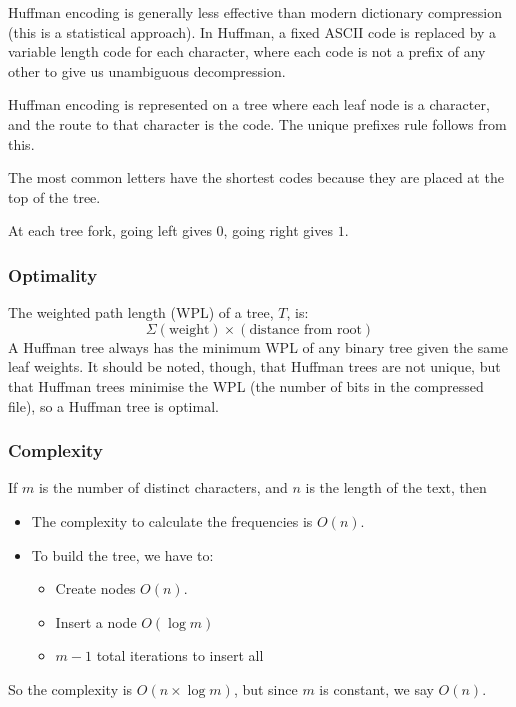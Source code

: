 Huffman encoding is generally less effective than modern dictionary compression (this is a statistical approach).
In Huffman, a fixed ASCII code is replaced by a variable length code for each character, where each code is not a prefix of any other to give us unambiguous decompression.

Huffman encoding is represented on a tree where each leaf node is a character, and the route to that character is the code.
The unique prefixes rule follows from this.

The most common letters have the shortest codes because they are placed at the top of the tree.

\begin{note}
    At each tree fork, going left gives \(0\), going right gives \(1\).
\end{note}

\subsubsection{Optimality}\label{ssub:optimality}

The weighted path length (WPL) of a tree, \(T\), is:
\[
    \Sigma (\text{weight}) \times (\text{distance from root})
\]
A Huffman tree always has the minimum WPL of any binary tree given the same leaf weights.
It should be noted, though, that Huffman trees are not unique, but that Huffman trees minimise the WPL (the number of bits in the compressed file), so a Huffman tree is optimal.

\subsubsection{Complexity}\label{ssub:complexity_ht}

If \(m\) is the number of distinct characters, and \(n\) is the length of the text, then
\begin{itemize}
    \item The complexity to calculate the frequencies is \(O(n)\).
    \item To build the tree, we have to:
          \begin{itemize}
              \item Create nodes \(O(n)\).
              \item Insert a node \(O(\log m)\)
              \item \(m-1\) total iterations to insert all
          \end{itemize}
\end{itemize}
So the complexity is \(O(n \times \log m)\), but since \(m\) is constant, we say \(O(n)\).

